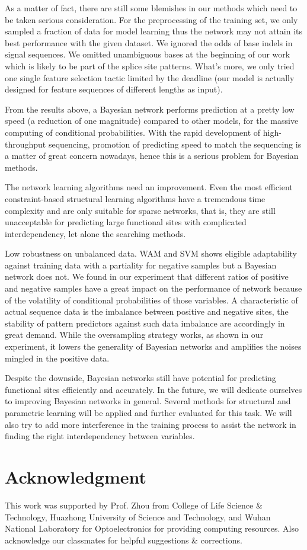 \documentclass[journal,twoside]{IEEEtran}
\begin{document}
As a matter of fact, there are still some blemishes in our methods which need to be taken serious consideration. For the preprocessing of the training set, we only sampled a fraction of data for model learning thus the network may not attain its best performance with the given dataset. We ignored the odds of base indels in signal sequences. We omitted unambiguous bases at the beginning of our work which is likely to be part of the splice site patterns. What's more, we only tried one single feature selection tactic limited by the deadline (our model is actually designed for feature sequences of different lengths as input). 

From the results above, a Bayesian network performs prediction at a pretty low speed (a reduction of one magnitude) compared to other models, for the massive computing of conditional probabilities. With the rapid development of high-throughput sequencing, promotion of predicting speed to match the sequencing is a matter of great concern nowadays, hence this is a serious problem for Bayesian methods. 

The network learning algorithms need an improvement. Even the most efficient constraint-based structural learning algorithms have a tremendous time complexity and are only suitable for sparse networks, that is, they are still unacceptable for predicting large functional sites with complicated interdependency, let alone the searching methods. 

Low robustness on unbalanced data. WAM and SVM shows eligible adaptability against training data with a partiality for negative samples but a Bayesian network does not. We found in our experiment that different ratios of positive and negative samples have a great impact on the performance of network because of the volatility of conditional probabilities of those variables. A characteristic of actual sequence data is the imbalance between positive and negative sites, the stability of pattern predictors against such data imbalance are accordingly in great demand. While the oversampling strategy works, as shown in our experiment, it lowers the generality of Bayesian networks and amplifies the noises mingled in the positive data. 

Despite the downside, Bayesian networks still have potential for predicting functional sites efficiently and accurately. In the future, we will dedicate ourselves to improving Bayesian networks in general. Several methods for structural and parametric learning will be applied and further evaluated for this task. We will also try to add more interference in the training process to assist the network in finding the right interdependency between variables. 

\section*{Acknowledgment}

This work was supported by Prof. Zhou from College of Life Science \& Technology, Huazhong University of Science and Technology, and Wuhan National Laboratory for Optoelectronics for providing computing resources. Also acknowledge our classmates for helpful suggestions \& corrections. 



\end{document}

